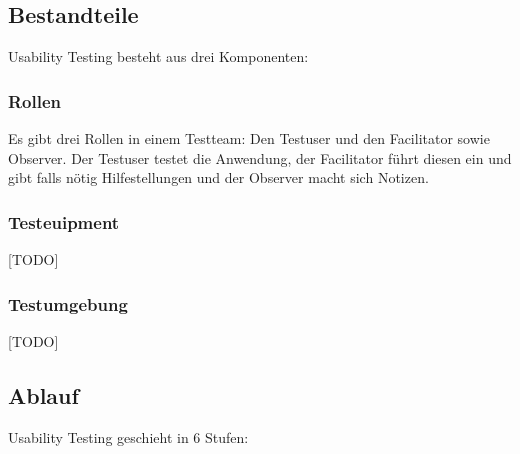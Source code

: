 \documentclass{article}
\begin{document}
	\subsection{Bestandteile}
	Usability Testing besteht aus drei Komponenten:
	\subsubsection{Rollen}
	Es gibt drei Rollen in einem Testteam: Den Testuser und den Facilitator sowie Observer. Der Testuser testet die Anwendung, der Facilitator führt diesen ein und gibt falls nötig Hilfestellungen und der Observer macht sich Notizen.
	\subsubsection{Testeuipment}
	[TODO]
	\subsubsection{Testumgebung}
	[TODO]
	\subsection{Ablauf}
	Usability Testing geschieht in 6 Stufen:
\end{document}
